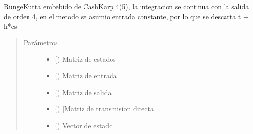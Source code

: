 \documentclass[letterpaper,10pt,spanish]{sphinxmanual}
\begin{document}
\begin{fulllineitems}
\label{\detokenize{codigos/rk_generator:rk_generator.cash_karp45}}
Runge\sphinxhyphen{}Kutta embebido de Cash\sphinxhyphen{}Karp 4(5), la integracion se continua con la salida de orden 4, en el metodo se asumio entrada constante, por lo que se descarta t + h*cs
\begin{quote}\begin{description}
\item[{Parámetros}] \leavevmode\begin{itemize}
\item {} 
 (\sphinxstyleliteralemphasis{\sphinxupquote{, }}\sphinxstyleliteralemphasis{\sphinxupquote{, }}) \textendash{} Matriz de estados

\item {} 
 (\sphinxstyleliteralemphasis{\sphinxupquote{, }}\sphinxstyleliteralemphasis{\sphinxupquote{, }}) \textendash{} Matriz de entrada

\item {} 
 (\sphinxstyleliteralemphasis{\sphinxupquote{, }}\sphinxstyleliteralemphasis{\sphinxupquote{, }}) \textendash{} Matriz de salida

\item {} 
 (\sphinxstyleliteralemphasis{\sphinxupquote{, }}\sphinxstyleliteralemphasis{\sphinxupquote{, }}) \textendash{} {[}Matriz de transmision directa

\item {} 
 (\sphinxstyleliteralemphasis{\sphinxupquote{, }}\sphinxstyleliteralemphasis{\sphinxupquote{, }}) \textendash{} Vector de estado


\end{itemize}
\end{description}
\end{quote}
\end{fulllineitems}
\end{document}
